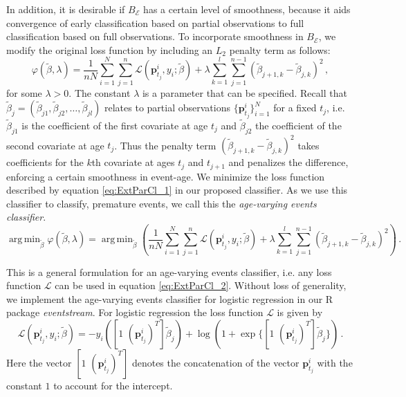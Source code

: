 \documentclass[a4paper,11pt]{article}
\DeclareMathOperator*{\argmin}{arg\,min}
\begin{document}
In addition, it is desirable if $B_{\mathscr{E}}$ has a certain level of smoothness, because it aids convergence of early classification based on partial observations to  full classification based on full observations. To incorporate smoothness in $B_{\mathscr{E}}$, we modify the original loss function by including an $L_2$ penalty term as follows:
\begin{equation}\label{eq:ExtParCl_1}
	\varphi\left(\tilde{\beta}, \lambda \right) = \frac{1}{nN} \sum_{i=1}^N \sum_{j=1}^n \mathscr{L} \left( \bm{p}^i_{t_j},y_i;\tilde{\beta} \right) + \lambda \sum_{k=1}^l\sum_{j=1}^{n-1} \left(\tilde{\beta}_{j+1,k} - \tilde{\beta}_{j,k} \right)^2 \, ,
\end{equation}
for some $\lambda >0 $. The constant $\lambda$ is a parameter that can be specified. Recall that $\tilde{\beta}_j = \left( \tilde{\beta}_{j1}, \tilde{\beta}_{j2}, \dots, \tilde{\beta}_{jl} \right)$ relates to partial observations $\{ \bm{p}^i_{t_j}\}_{i=1}^N$ for a fixed $t_j$, i.e. $\tilde{\beta}_{j1}$ is the coefficient of the first covariate at age $t_j$ and $\tilde{\beta}_{j2}$ the coefficient of the second covariate at age $t_j$. Thus the penalty term $(\tilde{\beta}_{j+1,k} - \tilde{\beta}_{j,k})^2$ takes coefficients for the $k$th covariate at ages $t_j$ and $t_{j+1}$ and penalizes the difference, enforcing a certain smoothness in event-age. We minimize the loss function described by equation \eqref{eq:ExtParCl_1} in our proposed classifier. As we use this classifier to classify, premature events, we call this the \textit{age-varying events classifier}.
\begin{equation}\label{eq:ExtParCl_2}
	\argmin_{\tilde{\beta}} \varphi\left(\tilde{\beta}, \lambda \right) = 	\argmin_{\tilde{\beta}} \left( \frac{1}{nN} \sum_{i=1}^N \sum_{j=1}^n \mathscr{L} ( \bm{p}^i_{t_j},y_i;\tilde{\beta} ) + \lambda \sum_{k=1}^l\sum_{j=1}^{n-1} (\tilde{\beta}_{j+1,k} - \tilde{\beta}_{j,k} )^2 \right) \, .
\end{equation}

This is a general formulation for an age-varying events classifier, i.e. any loss function $\mathscr{L}$ can be used in equation \eqref{eq:ExtParCl_2}. Without loss of generality, we implement the age-varying events classifier for logistic regression in our R package \textit{eventstream}. For logistic regression \cite{friedman2001elements} the loss function $\mathscr{L}$ is given by
\begin{equation}\label{eq:LogReg}
	\mathscr{L} (\bm{p}^i_{t_j},y_i;\tilde{\beta}) = - y_i \left( [ 1 \,\, ( \bm{p}^i_{t_j})^T] \tilde{\beta}_{j} \right) + \log \left( 1+ \exp\big\{[ 1 \, \,( \bm{p}^i_{t_j})^T ] \tilde{\beta}_{j}\big\} \right) \, .
\end{equation}
Here the vector $[1 \,\, ( \bm{p}^i_{t_j})^T]$ denotes the concatenation of the vector $\bm{p}^i_{t_j}$ with the constant $1$ to account for the intercept. %
\end{document}
